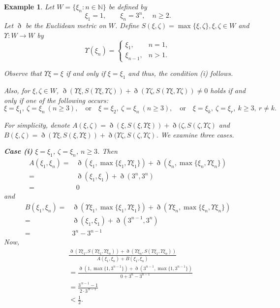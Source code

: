 \documentclass[pdflatex,sn-mathphys-num]{sn-jnl}%
\theoremstyle{thmstyleone}%
\theoremstyle{thmstyletwo}%
\newtheorem{example}{Example}%
\theoremstyle{thmstylethree}%
\begin{document}
\begin{example}
Let $W=\{\xi_n : n\in\mathbb{N}\}$ be defined by
\[
\xi_1=1, \qquad \xi_n=3^n,\quad n\ge2.
\]
Let $\eth$ be the Euclidean metric on $W$. Define $S(\xi,\zeta)=\max \{\xi ,\zeta\}, \xi,\zeta \in W$  and $\Upsilon :W\to W$ by
\[
\Upsilon(\xi_n)=
\begin{cases}
\xi_1, & n=1,\\
\xi_{n-1}, & n>1.
\end{cases}
\]

Observe that $\Upsilon \xi=\xi$ if and only if $\xi =\xi_1$ and thus, the condition (i) follows.



Also, for $\xi,\zeta \in W$, $\eth(\Upsilon \xi,S(\Upsilon \xi,\Upsilon \zeta)) + \eth(\Upsilon \zeta,S(\Upsilon \xi,\Upsilon \zeta)) \neq 0$ holds if and only if one of the following occurs:
\[
\xi =\xi_1,\ \zeta =\xi_n\ (n\ge3),
\quad \text{or}\quad
\xi =\xi_2,\ \zeta=\xi_n\ (n\ge3),
\quad \text{or}\quad
\xi =\xi_k,\ \zeta=\xi_r,\ k\ge3,\ r\ne k.
\]

 
 
 For simplicity, denote $A(\xi ,\zeta)=\eth(\xi,S(\xi,\Upsilon \xi ))+\eth(\zeta ,S(\zeta,\Upsilon \zeta)$ and $B(\xi ,\zeta)=\eth(\Upsilon \xi,S(\xi,\Upsilon \xi ))+\eth(\Upsilon \zeta,S(\zeta,\Upsilon \zeta)$. We examine three cases.

\medskip
\noindent
\textbf{Case (i)} $\xi =\xi_1$, $\zeta =\xi_n$, $n\ge3$. Then
\begin{equation*}
    \begin{split}
        A(\xi_1,\xi_n)=&\eth(\xi_1,\max \{\xi_1,\Upsilon \xi _1\})+\eth(\xi_n,\max \{\xi_n,\Upsilon \xi _n\})\\
        =& \eth(\xi_1,\xi_1)+\eth(3^n,3^n)\\
        =&0
    \end{split}
\end{equation*}
and 
\begin{equation*}
    \begin{split}
        B(\xi_1,\xi_n)=&\eth(\Upsilon \xi_1,\max \{\xi_1,\Upsilon \xi _1\})+\eth(\Upsilon \xi_n,\max \{\xi_n,\Upsilon \xi _n\})\\
        =&\eth(\xi_1,\xi_1)+\eth(3^{n-1},3^{n})\\
        =&3^n-3^{n-1}
    \end{split}
\end{equation*}
Now, 
\begin{equation}\label{8888}
\begin{split}
    &\frac{\eth(\Upsilon \xi_1,S(\Upsilon \xi_1,\Upsilon \xi _n))+\eth(\Upsilon \xi_n,S(\Upsilon \xi_1,\Upsilon \xi _n))}
     {A(\xi_1,\xi_n)+B(\xi_1,\xi_n)}\\
&= \frac{\eth(1,\max\{1,3^{n-1} \})+\eth(3^{n-1},\max\{1,3^{n-1} \})}{0+3^n-3^{n-1}}\\
&=\frac{3^{\,n-1}-1}{2\cdot 3^{\,n-1}}\\
&<\frac12.
\end{split}
\end{equation}


\end{example}
\end{document}
